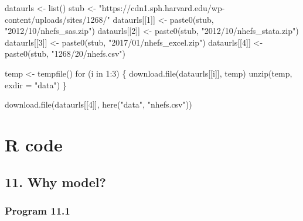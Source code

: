 \documentclass[
  10pt,
  a4paper,
]{book}
\newenvironment{Shaded}{\begin{snugshade}}{\end{snugshade}}
\newcommand{\AttributeTok}[1]{\textcolor[rgb]{0.40,0.45,0.13}{#1}}
\newcommand{\ControlFlowTok}[1]{\textcolor[rgb]{0.00,0.46,0.62}{#1}}
\newcommand{\DecValTok}[1]{\textcolor[rgb]{0.68,0.00,0.00}{#1}}
\newcommand{\FunctionTok}[1]{\textcolor[rgb]{0.28,0.35,0.67}{#1}}
\newcommand{\NormalTok}[1]{\textcolor[rgb]{0.00,0.46,0.62}{#1}}
\newcommand{\OtherTok}[1]{\textcolor[rgb]{0.00,0.46,0.62}{#1}}
\newcommand{\SpecialCharTok}[1]{\textcolor[rgb]{0.37,0.37,0.37}{#1}}
\newcommand{\StringTok}[1]{\textcolor[rgb]{0.13,0.47,0.30}{#1}}
\begin{document}
\begin{Shaded}
\begin{Highlighting}[]
\NormalTok{dataurls }\OtherTok{\textless{}{-}} \FunctionTok{list}\NormalTok{()}
\NormalTok{stub }\OtherTok{\textless{}{-}} \StringTok{"https://cdn1.sph.harvard.edu/wp{-}content/uploads/sites/1268/"}
\NormalTok{dataurls[[}\DecValTok{1}\NormalTok{]] }\OtherTok{\textless{}{-}} \FunctionTok{paste0}\NormalTok{(stub, }\StringTok{"2012/10/nhefs\_sas.zip"}\NormalTok{)}
\NormalTok{dataurls[[}\DecValTok{2}\NormalTok{]] }\OtherTok{\textless{}{-}} \FunctionTok{paste0}\NormalTok{(stub, }\StringTok{"2012/10/nhefs\_stata.zip"}\NormalTok{)}
\NormalTok{dataurls[[}\DecValTok{3}\NormalTok{]] }\OtherTok{\textless{}{-}} \FunctionTok{paste0}\NormalTok{(stub, }\StringTok{"2017/01/nhefs\_excel.zip"}\NormalTok{)}
\NormalTok{dataurls[[}\DecValTok{4}\NormalTok{]] }\OtherTok{\textless{}{-}} \FunctionTok{paste0}\NormalTok{(stub, }\StringTok{"1268/20/nhefs.csv"}\NormalTok{)}

\NormalTok{temp }\OtherTok{\textless{}{-}} \FunctionTok{tempfile}\NormalTok{()}
\ControlFlowTok{for}\NormalTok{ (i }\ControlFlowTok{in} \DecValTok{1}\SpecialCharTok{:}\DecValTok{3}\NormalTok{) \{}
  \FunctionTok{download.file}\NormalTok{(dataurls[[i]], temp)}
  \FunctionTok{unzip}\NormalTok{(temp, }\AttributeTok{exdir =} \StringTok{"data"}\NormalTok{)}
\NormalTok{\}}

\FunctionTok{download.file}\NormalTok{(dataurls[[}\DecValTok{4}\NormalTok{]], }\FunctionTok{here}\NormalTok{(}\StringTok{"data"}\NormalTok{, }\StringTok{"nhefs.csv"}\NormalTok{))}
\end{Highlighting}
\end{Shaded}

\mainmatter

\hypertarget{part-r-code}{%
\part*{R code}\label{part-r-code}}

\hypertarget{why-model}{%
\chapter*{11. Why model?}\label{why-model}}

\hypertarget{program-11.1}{%
\section{Program 11.1}\label{program-11.1}}
\end{document}
